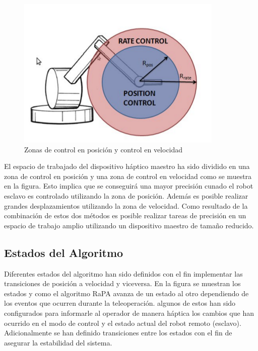 \begin{figure}
\centering
\includegraphics[scale=0.6]{FiguresSoA/Rapa}
\caption{Zonas de control en posición y control en velocidad}
\label{Phamthomrapa}
\end{figure}


El espacio de trabajado del dispositivo háptico maestro ha sido dividido en una zona de control en posición y una zona de control en velocidad como se muestra en la figura. Esto implica que se conseguirá una mayor precisión cunado el robot esclavo es controlado utilizando la zona de posición. Además es posible realizar grandes desplazamientos utilizando la zona de velocidad. Como resultado de  la combinación  de estos dos métodos es posible realizar tareas de precisión en un espacio de trabajo amplio utilizando un dispositivo maestro de tamaño reducido.

\subsection*{Estados del Algoritmo}

Diferentes estados del algoritmo han sido definidos con el fin implementar las transiciones de posición a velocidad y viceversa. En la figura se muestran los estados y como el algoritmo RaPA avanza de un estado al otro dependiendo de los eventos que ocurren durante la teleoperación. algunos de estos han sido configurados para informarle al operador de manera háptica los cambios que han ocurrido en el modo de control y el estado actual del robot remoto (esclavo). Adicionalmente se han definido transiciones entre los estados con el fin de asegurar la estabilidad del sistema.




